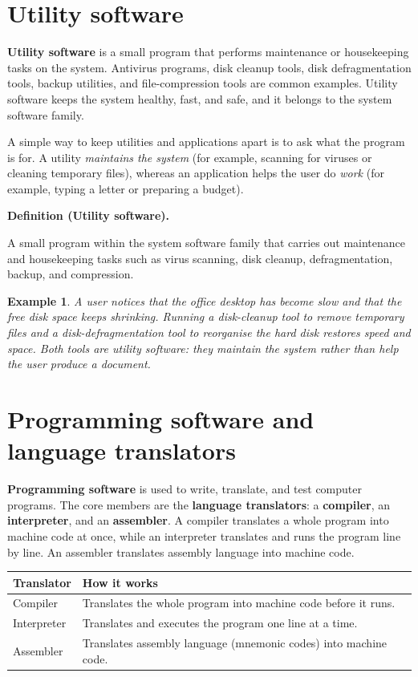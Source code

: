 \documentclass[11pt]{article}
\newtheorem{example}{Example}[section]
\newenvironment{definitionbox}[1]{%
  \par\noindent\textbf{Definition (#1).}\ \itshape
}{\par\vspace{0.3em}}
\begin{document}
\section{Utility software}
\textbf{Utility software} is a small program that performs maintenance or
housekeeping tasks on the system. Antivirus programs, disk cleanup tools,
disk defragmentation tools, backup utilities, and file-compression tools are
common examples. Utility software keeps the system healthy, fast, and safe,
and it belongs to the system software family.

A simple way to keep utilities and applications apart is to ask what the
program is for. A utility \emph{maintains the system} (for example, scanning
for viruses or cleaning temporary files), whereas an application helps the
user do \emph{work} (for example, typing a letter or preparing a budget).

\begin{definitionbox}{Utility software}
A small program within the system software family that carries out
maintenance and housekeeping tasks such as virus scanning, disk cleanup,
defragmentation, backup, and compression.
\end{definitionbox}

\begin{example}
A user notices that the office desktop has become slow and that the free disk
space keeps shrinking. Running a disk-cleanup tool to remove temporary files
and a disk-defragmentation tool to reorganise the hard disk restores speed and
space. Both tools are utility software: they maintain the system rather than
help the user produce a document.
\end{example}

\section{Programming software and language translators}
\textbf{Programming software} is used to write, translate, and test computer
programs. The core members are the \textbf{language translators}: a
\textbf{compiler}, an \textbf{interpreter}, and an \textbf{assembler}. A
compiler translates a whole program into machine code at once, while an
interpreter translates and runs the program line by line. An assembler
translates assembly language into machine code.

\begin{center}
\begin{tabular}{p{}p{}}
\toprule
\textbf{Translator} & \textbf{How it works} \\
\midrule
Compiler & Translates the whole program into machine code before it runs. \\
Interpreter & Translates and executes the program one line at a time. \\
Assembler & Translates assembly language (mnemonic codes) into machine code. \\
\bottomrule
\end{tabular}
\end{center}
\end{document}
